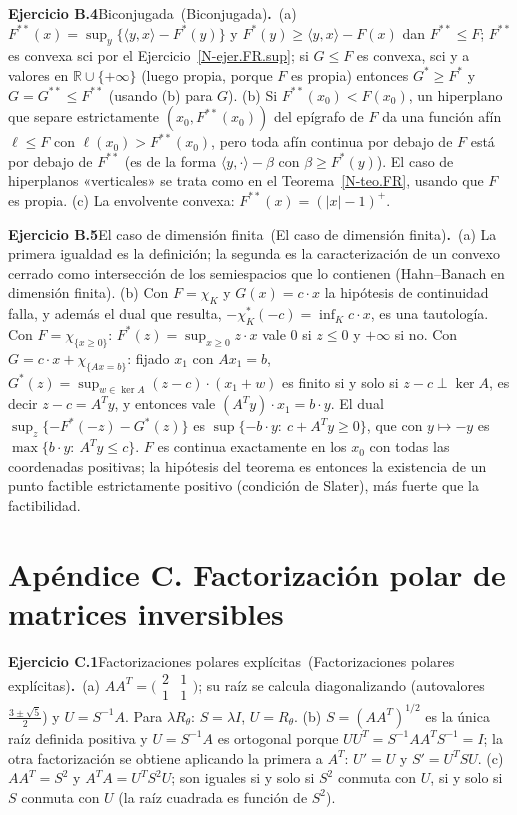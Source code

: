 \documentclass[11pt,a4paper]{amsart}
\newcommand{\R}{{\mathbb R}}
\theoremstyle{remark}
\theoremstyle{definition}
\numberwithin{subsection}{section}
\numberwithin{equation}{section}
\newcommand{\ejlabel}[2]{\par\medskip\noindent\textbf{Ejercicio #1}\ifx\relax#2\relax\else\ (#2)\fi\textbf{.}\ }
\begin{document}
\ejlabel{B.4}{Biconjugada}(a) $F^{**}(x)=\sup_y\{\langle y,x\rangle-F^*(y)\}$ y $F^*(y)\ge\langle y,x\rangle-F(x)$ dan $F^{**}\le F$; $F^{**}$ es convexa sci por el Ejercicio~\ref{N-ejer.FR.sup}; si $G\le F$ es convexa, sci y a valores en $\R\cup\{+\infty\}$ (luego propia, porque $F$ es propia) entonces $G^*\ge F^*$ y $G=G^{**}\le F^{**}$ (usando (b) para $G$). (b) Si $F^{**}(x_0)<F(x_0)$, un hiperplano que separe estrictamente $(x_0,F^{**}(x_0))$ del epígrafo de $F$ da una función afín $\ell\le F$ con $\ell(x_0)>F^{**}(x_0)$, pero toda afín continua por debajo de $F$ está por debajo de $F^{**}$ (es de la forma $\langle y,\cdot\rangle-\beta$ con $\beta\ge F^*(y)$). El caso de hiperplanos «verticales» se trata como en el Teorema~\ref{N-teo.FR}, usando que $F$ es propia. (c) La envolvente convexa: $F^{**}(x)=(|x|-1)^+$.

\ejlabel{B.5}{El caso de dimensión finita}(a) La primera igualdad es la definición; la segunda es la caracterización de un convexo cerrado como intersección de los semiespacios que lo contienen (Hahn--Banach en dimensión finita). (b) Con $F=\chi_K$ y $G(x)=c\cdot x$ la hipótesis de continuidad falla, y además el dual que resulta, $-\chi_K^*(-c)=\inf_Kc\cdot x$, es una tautología. Con $F=\chi_{\{x\ge0\}}$: $F^*(z)=\sup_{x\ge0}z\cdot x$ vale $0$ si $z\le0$ y $+\infty$ si no. Con $G=c\cdot x+\chi_{\{Ax=b\}}$: fijado $x_1$ con $Ax_1=b$, $G^*(z)=\sup_{w\in\ker A}(z-c)\cdot(x_1+w)$ es finito si y solo si $z-c\perp\ker A$, es decir $z-c=A^Ty$, y entonces vale $(A^Ty)\cdot x_1=b\cdot y$. El dual $\sup_z\{-F^*(-z)-G^*(z)\}$ es $\sup\{-b\cdot y:\ c+A^Ty\ge0\}$, que con $y\mapsto-y$ es $\max\{b\cdot y:\ A^Ty\le c\}$. $F$ es continua exactamente en los $x_0$ con todas las coordenadas positivas; la hipótesis del teorema es entonces la existencia de un punto factible estrictamente positivo (condición de Slater), más fuerte que la factibilidad.

\section*{Apéndice C. Factorización polar de matrices inversibles}
\ejlabel{C.1}{Factorizaciones polares explícitas}(a) $AA^T=\bigl(\begin{smallmatrix}2&1\\1&1\end{smallmatrix}\bigr)$; su raíz se calcula diagonalizando (autovalores $\frac{3\pm\sqrt5}2$) y $U=S^{-1}A$. Para $\lambda R_\theta$: $S=\lambda I$, $U=R_\theta$. (b) $S=(AA^T)^{1/2}$ es la única raíz definida positiva y $U=S^{-1}A$ es ortogonal porque $UU^T=S^{-1}AA^TS^{-1}=I$; la otra factorización se obtiene aplicando la primera a $A^T$: $U'=U$ y $S'=U^TSU$. (c) $AA^T=S^2$ y $A^TA=U^TS^2U$; son iguales si y solo si $S^2$ conmuta con $U$, si y solo si $S$ conmuta con $U$ (la raíz cuadrada es función de $S^2$).
\end{document}
